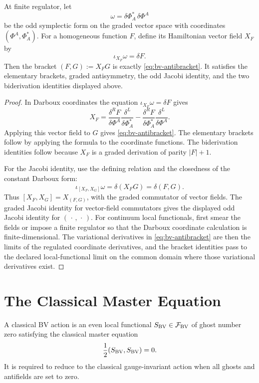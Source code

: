 \begin{lemma}
\label{lem:bv-antibracket-odd-symplectic-origin}
At finite regulator, let
\[
  \omega=\delta\Phi^*_A\,\delta\Phi^A
\]
be the odd symplectic form on the graded vector space with coordinates
\((\Phi^A,\Phi^*_A)\).  For a homogeneous function \(F\), define its
Hamiltonian vector field \(X_F\) by
\[
  \iota_{X_F}\omega=\delta F .
\]
Then the bracket \((F,G):=X_FG\) is exactly
\eqref{eq:bv-antibracket}.  It satisfies the elementary brackets,
graded antisymmetry, the odd Jacobi identity, and the two biderivation
identities displayed above.
\end{lemma}

\begin{proof}
In Darboux coordinates the equation
\(\iota_{X_F}\omega=\delta F\) gives
\[
  X_F
  =
  \frac{\delta^R F}{\delta\Phi^A}
  \frac{\delta^L}{\delta\Phi^*_A}
  -
  \frac{\delta^R F}{\delta\Phi^*_A}
  \frac{\delta^L}{\delta\Phi^A}.
\]
Applying this vector field to \(G\) gives
\eqref{eq:bv-antibracket}.  The elementary brackets follow by applying the
formula to the coordinate functions.  The biderivation identities follow
because \(X_F\) is a graded derivation of parity \(|F|+1\).

For the Jacobi identity, use the defining relation and the closedness of the
constant Darboux form:
\[
  \iota_{[X_F,X_G]}\omega
  =
  \delta(X_FG)
  =
  \delta(F,G).
\]
Thus \([X_F,X_G]=X_{(F,G)}\), with the graded commutator of vector fields.
The graded Jacobi identity for vector-field commutators gives the displayed
odd Jacobi identity for \((\,\cdot\,,\,\cdot\,)\).  For continuum local
functionals, first smear the fields or impose a finite regulator so that the
Darboux coordinate calculation is finite-dimensional.  The variational
derivatives in \eqref{eq:bv-antibracket} are then the limits of the regulated
coordinate derivatives, and the bracket identities pass to the declared
local-functional limit on the common domain where those variational
derivatives exist.
\end{proof}

\section{The Classical Master Equation}

\begin{definition}
A classical BV action is an even local functional \(S_{\rm BV}\in
\mathcal F_{\rm BV}\) of ghost number zero satisfying the classical master
equation
\begin{equation}
  \frac12(S_{\rm BV},S_{\rm BV})=0 .
  \label{eq:classical-master-equation}
\end{equation}
It is required to reduce to the classical gauge-invariant action when all
ghosts and antifields are set to zero.
\end{definition}

